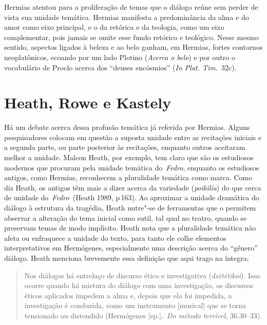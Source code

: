 Hermias atentou para a proliferação de temas que o diálogo reúne sem
perder de vista sua unidade temática. Hermias manifesta a predominância
da alma e do amor como eixo principal, e o da retórica e da teologia,
como um eixo complementar, pois jamais se omite esse fundo retórico e
teológico. Nesse mesmo sentido, aspectos ligados à beleza e ao belo
ganham, em Hermias, fortes contornos neoplatônicos, ecoando por um lado
Plotino (\emph{Acerca o belo}) e por outro o vocabulário de Proclo
acerca dos ``deuses encósmios'' (\emph{In Plat. Tim.}~32c).

 

\section{Heath, Rowe e Kastely}

 

Há um debate acerca dessa profusão temática já referida por Hermias.
Alguns pesquisadores colocam em questão a suposta unidade entre as
recitações iniciais e a segunda parte, ou parte posterior às recitações,
enquanto outros aceitaram melhor a unidade. Malcon Heath, por exemplo,
tem claro que são os estudiosos modernos que procuram pela unidade
temática do~\emph{Fedro}, enquanto os estudiosos antigos, como Hermias,
reconhecem a pluralidade temática como marca. Como diz Heath, os antigos
têm mais a dizer acerca da variedade (\emph{poikilía}) do que cerca de
unidade do~\emph{Fedro~}(Heath 1989, p\,163). Ao aproximar a unidade
dramática do diálogo à estrutura da tragédia, Heath nutre"-se de
ferramentas que o permitem observar a alteração do tema inicial como
sutil, tal qual no teatro, quando se preservam temas de modo implícito.
Heath nota que a pluralidade temática não afeta ou enfraquece a unidade
do texto, para tanto ele colhe elementos interpretativos em Hermógenes,
especialmente uma descrição acerca do ``gênero'' diálogo. Heath menciona
brevemente essa definição que aqui trago na íntegra:

 

\begin{quote}
Nos diálogos há entrelaço de discurso ético e investigativo
(\emph{dzêtêtikoí}). Isso ocorre quando há mistura do diálogo com uma
investigação, os discursos éticos aplicados impedem a alma e, depois que
ela foi impedida, a investigação é conduzida, como um instrumento
[musical] que se torna tensionado ou distendido (Hermógenes
[sp.],~\emph{Do método terrível}, 36.30--33).
\end{quote}

